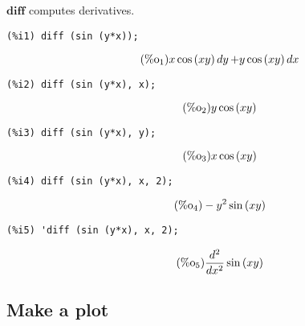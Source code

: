 \documentclass[12pt,leqno]{article}
\begin{document}
$\mathbf{diff}$ computes derivatives.
\begin{verbatim}
(%i1) diff (sin (y*x));
\end{verbatim}
\begin{equation}
\tag{$\mathop{\mathrm{\%o}}_{1}$}x \cos \left(x y\right) \mathop{dy}+y \cos \left(x y\right) \mathop{dx}
\label{eq:doc-group1-code30-1-1}
\end{equation}
\begin{verbatim}
(%i2) diff (sin (y*x), x);
\end{verbatim}
\begin{equation}
\tag{$\mathop{\mathrm{\%o}}_{2}$}y \cos \left(x y\right)
\label{eq:doc-group1-code30-2-1}
\end{equation}
\begin{verbatim}
(%i3) diff (sin (y*x), y);
\end{verbatim}
\begin{equation}
\tag{$\mathop{\mathrm{\%o}}_{3}$}x \cos \left(x y\right)
\label{eq:doc-group1-code30-3-1}
\end{equation}
\begin{verbatim}
(%i4) diff (sin (y*x), x, 2);
\end{verbatim}
\begin{equation}
\tag{$\mathop{\mathrm{\%o}}_{4}$}-{y}^{2} \sin \left(x y\right)
\label{eq:doc-group1-code30-4-1}
\end{equation}
\begin{verbatim}
(%i5) 'diff (sin (y*x), x, 2);
\end{verbatim}
\begin{equation}
\tag{$\mathop{\mathrm{\%o}}_{5}$}\frac{{d}^{2}}{d {x}^{2}}\sin \left(x y\right)
\label{eq:doc-group1-code30-5-1}
\end{equation}


\subsection{Make a plot}
\end{document}
